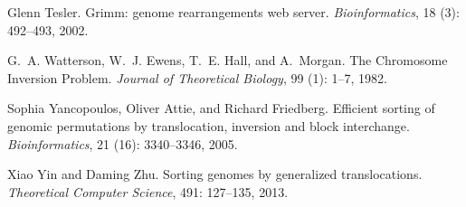 \documentclass[12pt,a4paper]{amsart}
\numberwithin{equation}{section}
\begin{document}
\begin{thebibliography}{38}
Glenn Tesler.
\newblock Grimm: genome rearrangements web server.
\newblock \emph{Bioinformatics}, 18 (3): 492--493, 2002.

G.~A. Watterson, W.~J. Ewens, T.~E. Hall, and A.~Morgan.
\newblock The {C}hromosome {I}nversion {P}roblem.
\newblock \emph{Journal of Theoretical Biology}, 99 (1):
  1--7, 1982.

Sophia Yancopoulos, Oliver Attie, and Richard Friedberg.
\newblock Efficient sorting of genomic permutations by translocation, inversion
  and block interchange.
\newblock \emph{Bioinformatics}, 21 (16): 3340--3346, 2005.

Xiao Yin and Daming Zhu.
\newblock Sorting genomes by generalized translocations.
\newblock \emph{Theoretical Computer Science}, 491: 127--135, 2013.

\end{thebibliography}
\end{document}
